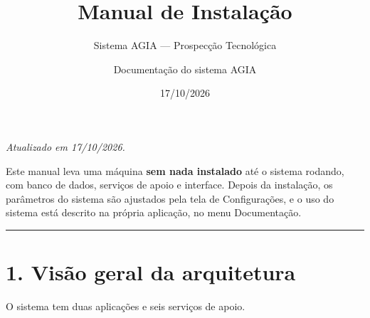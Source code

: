 \documentclass[
  brazilian,
  a4paper,12pt,oneside]{report}
\title{Manual de Instalação}
\subtitle{Sistema AGIA --- Prospecção Tecnológica}
\author{Documentação do sistema AGIA}
\date{17/10/2026}
\begin{document}
\maketitle

{
\setcounter{tocdepth}{1}
\tableofcontents
}
\emph{Atualizado em 17/10/2026.}

Este manual leva uma máquina \textbf{sem nada instalado} até o sistema
rodando, com banco de dados, serviços de apoio e interface. Depois da
instalação, os parâmetros do sistema são ajustados pela tela de
Configurações, e o uso do sistema está descrito na própria aplicação, no
menu Documentação.

\begin{center}\rule{0.5\linewidth}{0.5pt}\end{center}

\chapter{1. Visão geral da
arquitetura}\label{visuxe3o-geral-da-arquitetura}

O sistema tem duas aplicações e seis serviços de apoio.
\end{document}
